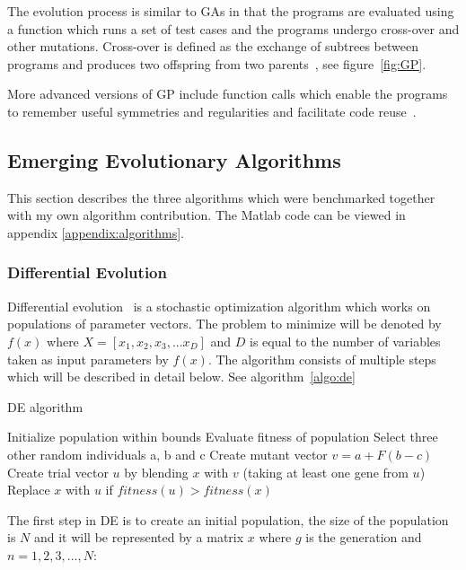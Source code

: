 The evolution process is similar to GAs in that the programs are evaluated using a function which runs a set of test cases and the programs undergo cross-over and other mutations. Cross-over is defined as the exchange of subtrees between programs and produces two offspring from two parents~\cite{Michalewicz1997}, see figure~\ref{fig:GP}.

More advanced versions of GP include function calls which enable the programs to remember useful symmetries and regularities and facilitate code reuse~\cite{Michalewicz1997}.

\subsection{Emerging Evolutionary Algorithms}

This section describes the three algorithms which were benchmarked together with my own algorithm contribution. The Matlab code can be viewed in appendix \ref{appendix:algorithms}.

\subsubsection{Differential Evolution}

Differential evolution~\cite{Storn1997} is a stochastic optimization algorithm which works on populations of parameter vectors. The problem to minimize will be denoted by $f(x)$ where $X=[x_1,x_2,x_3,...x_D]$ and $D$ is equal to the number of variables taken as input parameters by $f(x)$. The algorithm consists of multiple steps which will be described in detail below. See algorithm~\ref{algo:de}

\begin{algorithm}[h]
  \caption{DE algorithm}
  \label{algo:de}
    \begin{algorithmic}
      \State Initialize population within bounds
      \State Evaluate fitness of population
      \Repeat
          \State Select three other random individuals a, b and c
          \State Create mutant vector $v=a+F(b-c)$
          \State Create trial vector $u$ by blending $x$ with $v$ (taking at least one gene from $u$)
          \State Replace $x$ with $u$ if $fitness(u) > fitness(x)$
        \EndFor
    \end{algorithmic}
\end{algorithm}

The first step in DE is to create an initial population, the size of the population is $N$ and it will be represented by a matrix $x$ where $g$ is the generation and $n=1,2,3,...,N$:

